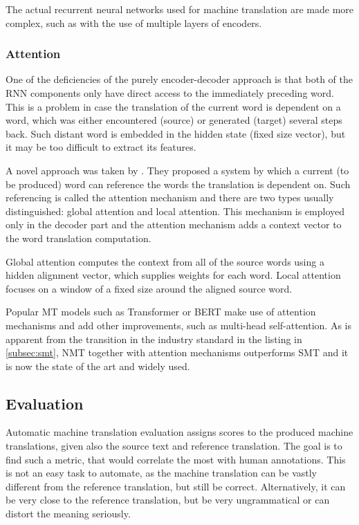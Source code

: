


The actual recurrent neural networks used for machine translation are made more complex, such as with the use of multiple layers of encoders.

\subsubsection{Attention}

One of the deficiencies of the purely encoder-decoder approach is that both of the RNN components only have direct access to the immediately preceding word. This is a problem in case the translation of the current word is dependent on a word, which was either encountered (source) or generated (target) several steps back. Such distant word is embedded in the hidden state (fixed size vector), but it may be too difficult to extract its features.

A novel approach was taken by \cite{bahdanau2014neural}. They proposed a system by which a current (to be produced) word can reference the words the translation is dependent on. Such referencing is called the attention mechanism and there are two types usually distinguished: global attention and local attention. This mechanism is employed only in the decoder part and the attention mechanism adds a context vector to the word translation computation.

Global attention computes the context from all of the source words using a hidden alignment vector, which supplies weights for each word. Local attention focuses on a window of a fixed size around the aligned source word.

Popular MT models such as Transformer \citep{attention_all_you_need} or BERT \citep{bert} make use of attention mechanisms and add other improvements, such as multi-head self-attention. As is apparent from the transition in the industry standard in the listing in \cref{subsec:smt}, NMT together with attention mechanisms outperforms SMT and it is now the state of the art and widely used.

\subsection{Evaluation}

Automatic machine translation evaluation assigns scores to the produced machine translations, given also the source text and reference translation. The goal is to find such a metric, that would correlate the most with human annotations. This is not an easy task to automate, as the machine translation can be vastly different from the reference translation, but still be correct. Alternatively, it can be very close to the reference translation, but be very ungrammatical or can distort the meaning seriously.


